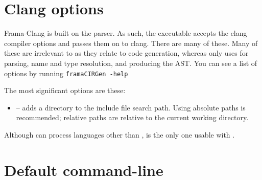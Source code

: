 \section{Clang options}

Frama-Clang is built on the \clang \cpp parser. 
As such, the \irg executable accepts the clang
compiler options and passes them on to clang. There are many of these.
Many of these are irrelevant to \fcl as they relate to 
code generation, whereas \fcl only uses \clang for parsing, name
and type resolution, and producing the AST.
You can see a list of options by running 
\lstinline|framaCIRGen -help|

The most significant \cl options are these:
\begin{itemize}
	\item {} -- adds a directory to the include file search path. Using absolute paths is recommended; relative paths are relative to the current working directory.
\end{itemize}

Although \clang can process languages other than \cpp, \cpp is the only one usable with \fclang.

\section{Default command-line}


